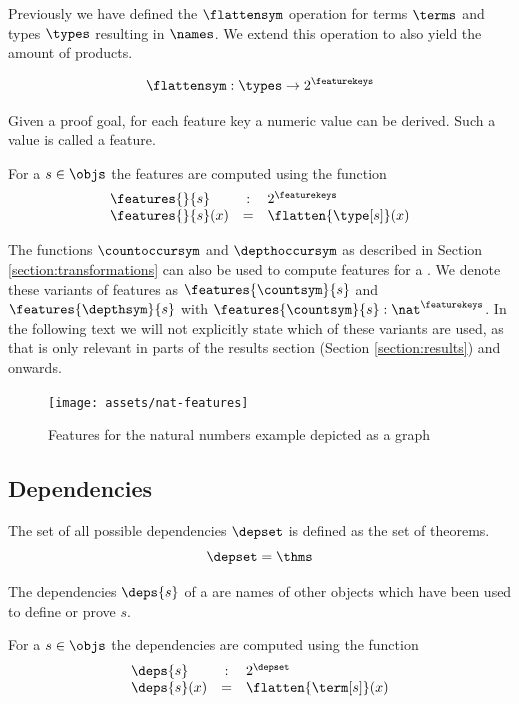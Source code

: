 Previously we have defined the $\flattensym$ operation for terms $\terms$ and types $\types$ resulting in $\names$.
We extend this operation to also yield the amount of products.

\[ \flattensym : \types \rightarrow 2^{\featurekeys} \]

Given a proof goal, for each feature key a numeric value can be derived.
Such a value is called a feature.

\begin{definition}\label{def:features}
  For a \coqobj $s \in \objs$ the features are computed using the function
  $$
  \begin{array}{lcl}
    \features{}{s} & : & 2^\featurekeys \\
    \features{}{s}(x) & = & \flatten{\type[s]}(x)
  \end{array}
  $$
\end{definition}

The functions $\countoccursym$ and $\depthoccursym$ as described in Section \ref{section:transformations} can also be used to compute features for a \coqobj.
We denote these variants of features as $\features{\countsym}{s}$ and $\features{\depthsym}{s}$ with $\features{\countsym}{s} : \nat^\featurekeys$.
In the following text we will not explicitly state which of these variants are used,
as that is only relevant in parts of the results section (Section \ref{section:results}) and onwards.

\begin{figure}[H]
	\centering
	\texttt{[image: assets/nat-features]}
	\caption{Features for the natural numbers example depicted as a graph}
\end{figure}

\subsection{Dependencies}
\label{section:deps}

\begin{definition}\label{def:depset}
  The set of all possible dependencies $\depset$ is defined as the set of theorems.
  $$
  \depset = \thms
  $$
\end{definition}

The dependencies $\deps{s}$ of a \coqobj[s] are names of other objects which have been used to define or prove $s$.

\begin{definition}\label{def:deps}
  For a \coqobj $s \in \objs$ the dependencies are computed using the function
  $$
  \begin{array}{lcl}
    \deps{s} & : & 2^{\depset} \\
    \deps{s}(x) & = & \flatten{\term[s]}(x)
  \end{array}
  $$
\end{definition}

